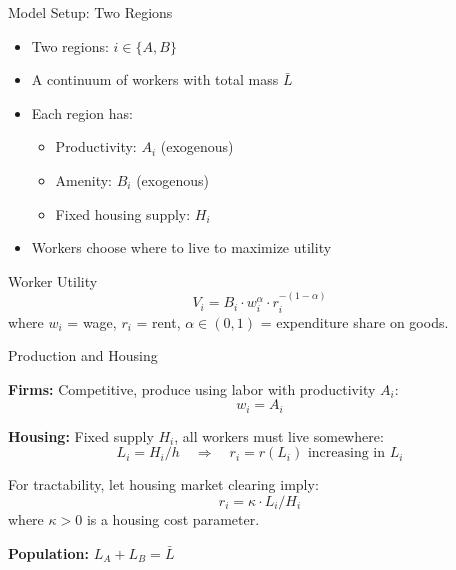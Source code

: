 \documentclass{beamer}
\begin{document}
\begin{frame}{Model Setup: Two Regions}

    \begin{itemize}
        \item Two regions: $i \in \{A, B\}$
        \item A continuum of  workers with total mass $\bar{L}$
        \item Each region has:
            \begin{itemize}
                \item Productivity: $A_i$ (exogenous)
                \item Amenity: $B_i$ (exogenous)
                \item Fixed housing supply: $H_i$
            \end{itemize}
        \item Workers choose where to live to maximize utility
    \end{itemize}

    \vspace{0.5em}
    \begin{block}{Worker Utility}
        \vspace{-0.5em}
        \[ V_i = B_i \cdot w_i^\alpha \cdot r_i^{-(1-\alpha)} \]
        where $w_i$ = wage, $r_i$ = rent, $\alpha \in (0,1)$ = expenditure share on goods.
    \end{block}

\end{frame}

\begin{frame}{Production and Housing}

    \textbf{Firms:} Competitive, produce using labor with productivity $A_i$:
    \[ w_i = A_i \]

    \vspace{0.5em}
    \textbf{Housing:} Fixed supply $H_i$, all workers must live somewhere:
    \[ L_i = H_i / h \quad \Rightarrow \quad r_i = r(L_i) \text{ increasing in } L_i \]

    For tractability, let housing market clearing imply:
    \[ r_i = \kappa \cdot L_i / H_i \]
    where $\kappa > 0$ is a housing cost parameter.

    \vspace{0.5em}
    \textbf{Population:} $L_A + L_B = \bar{L}$

\end{frame}
\end{document}
